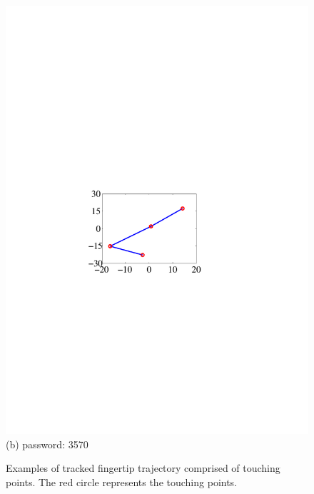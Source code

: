 \begin{figure}[!t]
{\begin{minipage}[t]{0.22\textwidth}
                \includegraphics[width=\textwidth]{fig/pin_3570.pdf}\\
                \centering \footnotesize (b) password: 3570
             \end{minipage}
        }
        \caption{Examples of tracked fingertip trajectory comprised of touching points. The red circle represents the touching points.}
        \label{fig:pins_trajectory}
    \end{figure}

